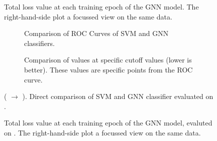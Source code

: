 \documentclass[
	fontsize=10pt, %
	twoside=false, %
	secnumdepth=1, %
  toc=indentunnumbered %
]{kaobook}
\begin{document}
\begin{figure}[h]
  \centering
  \begin{subfigure}[h]{0.49\linewidth}
  \end{subfigure}
  \begin{subfigure}[h]{0.49\linewidth}
  \end{subfigure}
  \caption{Total loss value at each training epoch of the GNN model. The right-hand-side plot a
    focussed view on the same data.}
  \label{fig:svm-repro-loss}
\end{figure}




\begin{figure}[h]
  \centering
  \begin{subfigure}[h]{0.49\linewidth}
    \caption{Comparison of ROC Curves of SVM and GNN classifiers.}
  \end{subfigure}
  \begin{subfigure}[h]{0.49\linewidth}
    \caption{Comparison of \FPR values at specific \TPR cutoff values (lower is better). These
      values are specific points from the ROC curve.}
  \end{subfigure}
  \caption{(\ADMap{} $\rightarrow$ \ReconMap).
    Direct comparison of SVM and GNN classifier evaluated on \ReconMap{}.}
  \label{fig:svm-repro-reconmapolder-roc-train-test}
\end{figure}
\begin{figure}[h]
  \centering
  \begin{subfigure}[h]{0.49\linewidth}
  \end{subfigure}
  \begin{subfigure}[h]{0.49\linewidth}
  \end{subfigure}
  \caption{Total loss value at each training epoch of the GNN model, evaluted on
    \ReconMap{}. The right-hand-side plot a focussed view on the same data.}
  \label{fig:svm-repro-reconmapolder-loss}
\end{figure}
\end{document}
